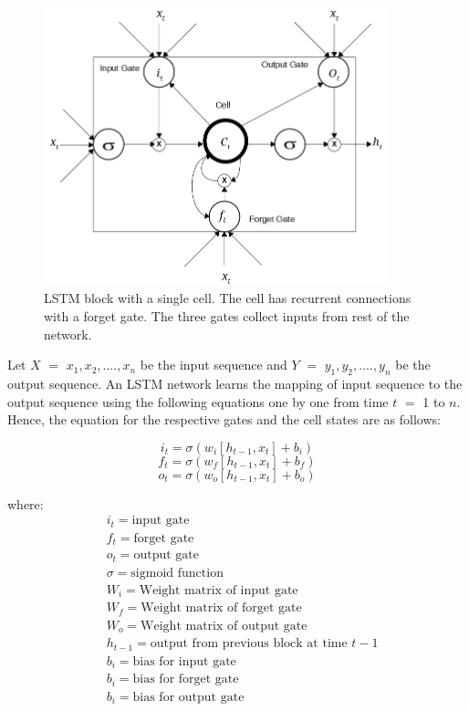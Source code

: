 \begin{figure}[!htbp]
    \centering
    \includegraphics[width=10cm]{pics/lstm.jpg}
    \captionsetup{justification=centering,margin=2cm}
    \caption{\gls{LSTM} block with a single cell. The cell has recurrent connections with a forget gate. The three gates collect inputs from rest of the network. }
    \label{fig:LSTM_BLOCK}
\end{figure}


Let $X$ $=$ ${x_{1}, x_{2},....,x_{n}}$ be the input sequence and $Y$ $=$ ${y_{1}, y_{2},....,y_{n}}$ be the output sequence. An \gls{LSTM} network learns the mapping of input sequence to the output sequence using the following equations one by one from time $t$ $=$ 1 to $n$. Hence, the equation for the respective gates and the cell states are as follows:

\begin{equation} \label{eq:lstm_input_gate}
    i_{t} =\sigma(w_{i}[h_{t-1},x_{t}]+b_{i})
\end{equation}
\begin{equation}\label{eq:lstm_forget_gate}
    f_{t} =\sigma(w_{f}[h_{t-1},x_{t}]+b_{f})
\end{equation}
\begin{equation}\label{eq:lstm_output_gate}
    o_{t} = \sigma(w_{o}[h_{t-1},x_{t}]+b_{o})
\end{equation}

where:
\begin{align*}
      & i_{t}=\text{input gate}\\
      & f_{t}=\text{forget gate}\\
      & o_{t}=\text{output gate}\\
      & \sigma=\text{sigmoid function}\\
      & W_{i}=\text{Weight matrix of input gate}\\
      & W_{f}=\text{Weight matrix of forget gate}\\
      & W_{o}=\text{Weight matrix of output gate}\\
      & h_{t-1}=\text{output from previous block at time $t-1$}      \\
      & b_{i}=\text{bias for input gate}    \\
      & b_{i}=\text{bias for forget gate}    \\
      & b_{i}=\text{bias for output gate}\\
\end{align*}

